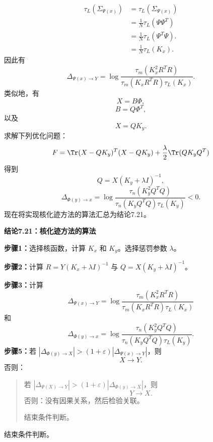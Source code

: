 \begin{equation}
\begin{aligned}
\tau_L(\Sigma_{\Psi(x)})&=\tau_L(\Sigma_{\Psi(x)})\\
&=\frac1N\tau_L(\Psi\Psi^T)\\
&=\frac1N\tau_L(\Psi^T\Psi).\\
&=\frac1N\tau_L(K_x).
\end{aligned}
\tag{7.153}
\end{equation}
因此有
\begin{equation}
\Delta_{\Psi(x)\to Y}=\log\frac{\tau_m(K_x^2R^TR)}{\tau_m(K_xR^TR)\tau_L(K_x)}.
\tag{7.154}
\end{equation}
类似地，有
\begin{equation}
X=B\Phi,
\tag{7.155}
\end{equation}
\begin{equation}
B=Q\Phi^T,
\tag{7.156}
\end{equation}
以及
\begin{equation}
X=QK_y.
\tag{7.157}
\end{equation}
求解下列优化问题：
\[
F=\Tr(X-QK_y)^T(X-QK_y)+\frac\lambda2\Tr(QK_yQ^T)
\]
得到
\[
Q=X(K_y+\lambda I)^{-1},
\]
\begin{equation}
\Delta_{\Phi(y)\to x}=\log\frac{\tau_n(K_y^2Q^TQ)}{\tau_n(K_yQ^TQ)\tau_L(K_y)}<0.
\tag{7.158}
\end{equation}
现在将实现核化迹方法的算法汇总为结论7.21。

\par\medskip{}\noindent\textbf{结论7.21：核化迹方法的算法}\label{ch07a-result-kernel-algorithm}\par
\noindent\textbf{步骤1：}选择核函数，计算 $K_x$ 和 $K_y$。选择惩罚参数 $\lambda$。

\noindent\textbf{步骤2：}计算 $R=Y(K_x+\lambda I)^{-1}$ 与 $Q=X(K_y+\lambda I)^{-1}$。

\noindent\textbf{步骤3：}计算
\[
\Delta_{\Psi(x)\to Y}=\log\frac{\tau_m(K_x^2R^TR)}{\tau_m(K_xR^TR)\tau_L(K_x)}
\]
和
\[
\Delta_{\Phi(y)\to x}=\log\frac{\tau_n(K_y^2Q^TQ)}{\tau_n(K_yQ^TQ)\tau_L(K_y)}.
\]
\noindent\textbf{步骤5：}若 $|\Delta_{\Phi(y)\to X}|>(1+\varepsilon)|\Delta_{\Psi(x)\to Y}|$，则
\[
X\to Y.
\]
否则：
\begin{quote}
若 $|\Delta_{\Psi(X)\to Y}|>(1+\varepsilon)|\Delta_{\Phi(y)\to X}|$，则
\[
Y\to X.
\]
否则：没有因果关系，然后检验关联。

结束条件判断。
\end{quote}
结束条件判断。
